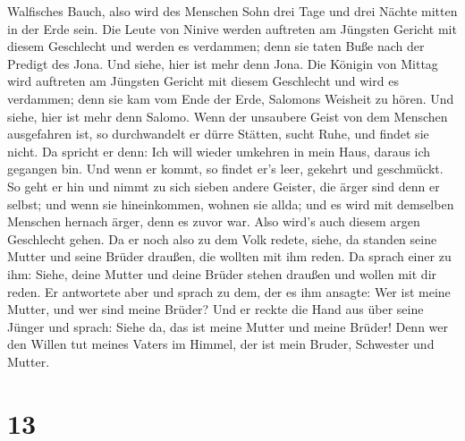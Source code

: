 Walfisches Bauch, also wird des Menschen Sohn drei Tage und drei Nächte
mitten in der Erde sein.  Die Leute von Ninive werden
auftreten am Jüngsten Gericht mit diesem Geschlecht und werden es
verdammen; denn sie taten Buße nach der Predigt des Jona. Und siehe,
hier ist mehr denn Jona.  Die Königin von Mittag wird
auftreten am Jüngsten Gericht mit diesem Geschlecht und wird es
verdammen; denn sie kam vom Ende der Erde, Salomons Weisheit zu hören.
Und siehe, hier ist mehr denn Salomo.  Wenn der unsaubere
Geist von dem Menschen ausgefahren ist, so durchwandelt er dürre
Stätten, sucht Ruhe, und findet sie nicht.  Da spricht er
denn: Ich will wieder umkehren in mein Haus, daraus ich gegangen bin.
Und wenn er kommt, so findet er's leer, gekehrt und geschmückt.
 So geht er hin und nimmt zu sich sieben andere Geister,
die ärger sind denn er selbst; und wenn sie hineinkommen, wohnen sie
allda; und es wird mit demselben Menschen hernach ärger, denn es zuvor
war. Also wird's auch diesem argen Geschlecht gehen.  Da er
noch also zu dem Volk redete, siehe, da standen seine Mutter und seine
Brüder draußen, die wollten mit ihm reden.  Da sprach einer
zu ihm: Siehe, deine Mutter und deine Brüder stehen draußen und wollen
mit dir reden.  Er antwortete aber und sprach zu dem, der
es ihm ansagte: Wer ist meine Mutter, und wer sind meine Brüder?
 Und er reckte die Hand aus über seine Jünger und sprach:
Siehe da, das ist meine Mutter und meine Brüder!  Denn wer
den Willen tut meines Vaters im Himmel, der ist mein Bruder, Schwester
und Mutter.

\hypertarget{section-12}{%
\section{13}\label{section-12}}

